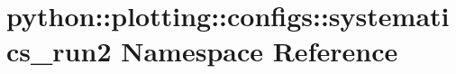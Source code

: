 \hypertarget{namespacepython_1_1plotting_1_1configs_1_1systematics__run2}{
\section{python::plotting::configs::systematics\_\-run2 Namespace Reference}
\label{namespacepython_1_1plotting_1_1configs_1_1systematics__run2}
}
